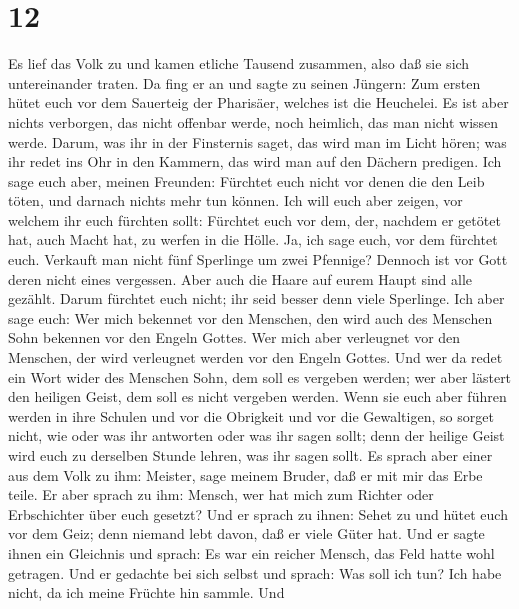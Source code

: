 \hypertarget{section-11}{%
\section{12}\label{section-11}}

 Es lief das Volk zu und kamen etliche Tausend zusammen,
also daß sie sich untereinander traten. Da fing er an und sagte zu
seinen Jüngern: Zum ersten hütet euch vor dem Sauerteig der Pharisäer,
welches ist die Heuchelei.  Es ist aber nichts verborgen,
das nicht offenbar werde, noch heimlich, das man nicht wissen werde.
 Darum, was ihr in der Finsternis saget, das wird man im
Licht hören; was ihr redet ins Ohr in den Kammern, das wird man auf den
Dächern predigen.  Ich sage euch aber, meinen Freunden:
Fürchtet euch nicht vor denen die den Leib töten, und darnach nichts
mehr tun können.  Ich will euch aber zeigen, vor welchem ihr
euch fürchten sollt: Fürchtet euch vor dem, der, nachdem er getötet hat,
auch Macht hat, zu werfen in die Hölle. Ja, ich sage euch, vor dem
fürchtet euch.  Verkauft man nicht fünf Sperlinge um zwei
Pfennige? Dennoch ist vor Gott deren nicht eines vergessen. 
Aber auch die Haare auf eurem Haupt sind alle gezählt. Darum fürchtet
euch nicht; ihr seid besser denn viele Sperlinge.  Ich aber
sage euch: Wer mich bekennet vor den Menschen, den wird auch des
Menschen Sohn bekennen vor den Engeln Gottes.  Wer mich aber
verleugnet vor den Menschen, der wird verleugnet werden vor den Engeln
Gottes.  Und wer da redet ein Wort wider des Menschen Sohn,
dem soll es vergeben werden; wer aber lästert den heiligen Geist, dem
soll es nicht vergeben werden.  Wenn sie euch aber führen
werden in ihre Schulen und vor die Obrigkeit und vor die Gewaltigen, so
sorget nicht, wie oder was ihr antworten oder was ihr sagen sollt;
 denn der heilige Geist wird euch zu derselben Stunde
lehren, was ihr sagen sollt.  Es sprach aber einer aus dem
Volk zu ihm: Meister, sage meinem Bruder, daß er mit mir das Erbe teile.
 Er aber sprach zu ihm: Mensch, wer hat mich zum Richter
oder Erbschichter über euch gesetzt?  Und er sprach zu
ihnen: Sehet zu und hütet euch vor dem Geiz; denn niemand lebt davon,
daß er viele Güter hat.  Und er sagte ihnen ein Gleichnis
und sprach: Es war ein reicher Mensch, das Feld hatte wohl getragen.
 Und er gedachte bei sich selbst und sprach: Was soll ich
tun? Ich habe nicht, da ich meine Früchte hin sammle.  Und
